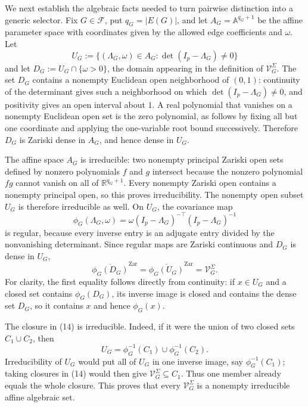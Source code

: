 We next establish the algebraic facts needed to turn pairwise distinction into a generic selector.  Fix \(G\in\mathcal F\), put \(q_G=|E(G)|\), and let \(A_G=\mathbb A^{q_G+1}\) be the affine parameter space with coordinates given by the allowed edge coefficients and \(\omega\).  Let
\[
U_G:=\{(\Lambda_G,\omega)\in A_G:\det(I_p-\Lambda_G)\ne0\}
\]
and let \(D_G:=U_G\cap\{\omega>0\}\), the domain appearing in the definition of \(\mathcal V_G^\Sigma\).  The set \(D_G\) contains a nonempty Euclidean open neighborhood of \((0,1)\): continuity of the determinant gives such a neighborhood on which \(\det(I_p-\Lambda_G)\ne0\), and positivity gives an open interval about \(1\).  A real polynomial that vanishes on a nonempty Euclidean open set is the zero polynomial, as follows by fixing all but one coordinate and applying the one-variable root bound successively.  Therefore \(D_G\) is Zariski dense in \(A_G\), and hence dense in \(U_G\).

The affine space \(A_G\) is irreducible: two nonempty principal Zariski open sets defined by nonzero polynomials \(f\) and \(g\) intersect because the nonzero polynomial \(fg\) cannot vanish on all of \(\mathbb R^{q_G+1}\).  Every nonempty Zariski open contains a nonempty principal open, so this proves irreducibility.  The nonempty open subset \(U_G\) is therefore irreducible as well.  On \(U_G\), the covariance map
\[
\phi_G(\Lambda_G,\omega)
=\omega(I_p-\Lambda_G)^{-\top}(I_p-\Lambda_G)^{-1}
\tag{13}
\]
is regular, because every inverse entry is an adjugate entry divided by the nonvanishing determinant.  Since regular maps are Zariski continuous and \(D_G\) is dense in \(U_G\),
\[
\overline{\phi_G(D_G)}^{\mathrm{Zar}}
=\overline{\phi_G(U_G)}^{\mathrm{Zar}}
=\mathcal V_G^\Sigma.
\tag{14}
\]
For clarity, the first equality follows directly from continuity: if \(x\in U_G\) and a closed set contains \(\phi_G(D_G)\), its inverse image is closed and contains the dense set \(D_G\), so it contains \(x\) and hence \(\phi_G(x)\).

The closure in (14) is irreducible.  Indeed, if it were the union of two closed sets \(C_1\cup C_2\), then
\[
U_G=\phi_G^{-1}(C_1)\cup\phi_G^{-1}(C_2).
\]
Irreducibility of \(U_G\) would put all of \(U_G\) in one inverse image, say \(\phi_G^{-1}(C_1)\); taking closures in (14) would then give \(\mathcal V_G^\Sigma\subseteq C_1\).  Thus one member already equals the whole closure.  This proves that every \(\mathcal V_G^\Sigma\) is a nonempty irreducible affine algebraic set.

